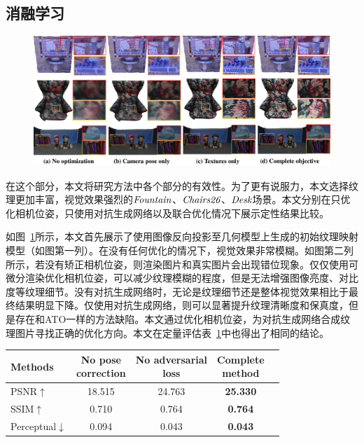 \subsection{消融学习}
\begin{figure}[ht]
\centering
\includegraphics[width=1\linewidth]{pic/work1/final.pdf}
\label{fig:ex1_2}
\end{figure}
在这个部分，本文将研究方法中各个部分的有效性。为了更有说服力，本文选择纹理更加丰富，视觉效果强烈的$\emph{Fountain}$、$\emph{Chairs26}$、$\emph{Desk}$场景。本文分别在只优化相机位姿，只使用对抗生成网络以及联合优化情况下展示定性结果比较。\par
如图~\ref{fig:ex1_2}所示，本文首先展示了使用图像反向投影至几何模型上生成的初始纹理映射模型（如图第一列）。在没有任何优化的情况下，视觉效果非常模糊。如图第二列所示，若没有矫正相机位姿，则渲染图片和真实图片会出现错位现象。仅仅使用可微分渲染优化相机位姿，可以减少纹理模糊的程度，但是无法增强图像亮度、对比度等纹理细节。没有对抗生成网络时，无论是纹理细节还是整体视觉效果相比于最终结果明显下降。仅使用对抗生成网络，则可以显著提升纹理清晰度和保真度，但是存在和ATO一样的方法缺陷。本文通过优化相机位姿，为对抗生成网络合成纹理图片寻找正确的优化方向。本文在定量评估表~\ref{tab:ablation}中也得出了相同的结论。\par
\begin{table}[h]
\renewcommand{\arraystretch}{1.3}
\label{tab:ablation}
	\centering
		\begin{tabular}{lcccc}
			\hline
			{Methods} & \tabincell{c}{No pose \\ correction} &\tabincell{c}{No adversarial \\ loss} & \tabincell{c}{Complete \\ method} \\
			\hline
			PSNR$\uparrow$ & 18.515 & 24.763 & \textbf{25.330}\\
			SSIM$\uparrow$ & 0.710  & 0.764 & \textbf{0.764}\\
			Perceptual$\downarrow$ & 0.094  & 0.043 & \textbf{0.043}\\
			\hline
		\end{tabular}
\end{table}


